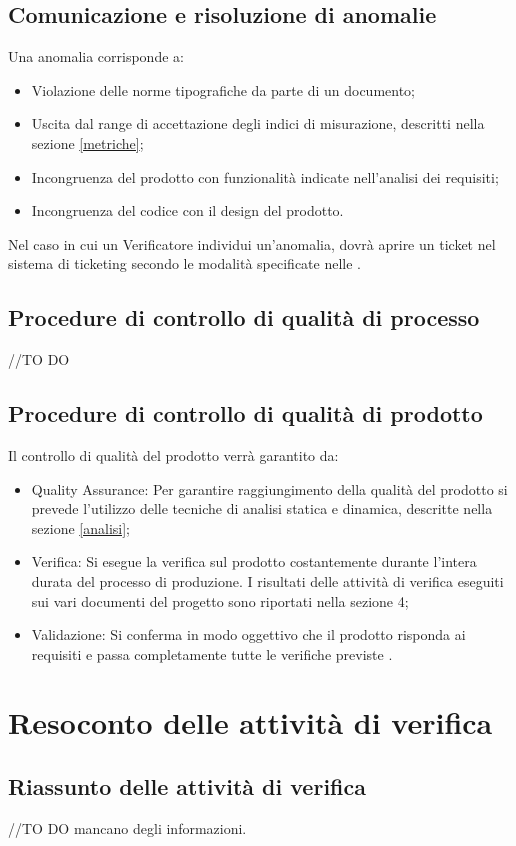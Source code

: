 \documentclass[12pt,a4paper]{article}
\begin{document}
\subsection{Comunicazione e risoluzione di anomalie}
Una anomalia corrisponde a:
\begin{itemize}
\item Violazione delle norme tipografiche da parte di un documento;
\item Uscita dal range di accettazione degli indici di misurazione, descritti nella sezione \ref{metriche};
\item Incongruenza del prodotto con funzionalità indicate nell’analisi dei requisiti;
\item Incongruenza del codice con il design del prodotto.
\end{itemize}
Nel caso in cui un Verificatore individui un’anomalia, dovrà aprire un ticket nel sistema di ticketing secondo le modalità specificate nelle \NdP.
\subsection{Procedure di controllo di qualità di processo}
//TO DO \IB
\subsection{Procedure di controllo di qualità di prodotto}
Il controllo di qualità del prodotto verrà garantito da:
\begin{itemize}
\item Quality Assurance: Per garantire raggiungimento della qualità del prodotto  si  prevede l'utilizzo delle tecniche di analisi statica e dinamica, descritte nella sezione \ref{analisi};
\item Verifica: Si esegue la verifica sul prodotto costantemente durante l'intera durata del processo di produzione. I risultati delle attività di verifica eseguiti sui vari documenti del progetto sono riportati nella sezione 4;
\item Validazione: Si conferma in modo oggettivo che il prodotto risponda ai requisiti e passa completamente tutte le verifiche previste .
\end{itemize}
\newpage
\appendix
\section{ Resoconto delle attività di verifica}
\subsection{Riassunto delle attività di verifica}
//TO DO \IB mancano degli informazioni.
\end{document}
